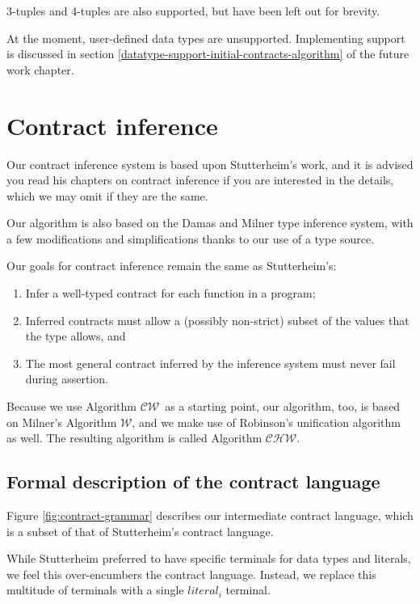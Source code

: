 \documentclass[10pt]{report}
\newcommand{\W}{$\mathcal{W}$}
\newcommand{\CW}{$\mathcal{CW}$}
\newcommand{\CHW}{$\mathcal{CHW}$}
\begin{document}
3-tuples and 4-tuples are also supported, but have been left out for brevity.

At the moment, user-defined data types are unsupported.
Implementing support is discussed in section \ref{datatype-support-initial-contracts-algorithm} of the future work chapter.

\section{Contract inference}
Our contract inference system is based upon Stutterheim's work, and it is advised you read his chapters on contract inference if you are interested in the details, which we may omit if they are the same.

Our algorithm is also based on the Damas and Milner type inference system, with a few modifications and simplifications thanks to our use of a type source.

Our goals for contract inference remain the same as Stutterheim's:
\begin{enumerate}
	\item Infer a well-typed contract for each function in a program;
	\item Inferred contracts must allow a (possibly non-strict) subset of the values that the type allows, and
	\item The most general contract inferred by the inference system must never fail during assertion.
\end{enumerate}

Because we use Algorithm \CW ~as a starting point, our algorithm, too, is based on Milner's Algorithm \W, and we make use of Robinson's unification algorithm as well.
The resulting algorithm is called Algorithm \CHW.

\subsection{Formal description of the contract language}
Figure \ref{fig:contract-grammar} describes our intermediate contract language, which is a subset of that of Stutterheim's contract language.

While Stutterheim preferred to have specific terminals for data types and literals, we feel this over-encumbers the contract language.
Instead, we replace this multitude of terminals with a single $literal_i$ terminal.
\end{document}
